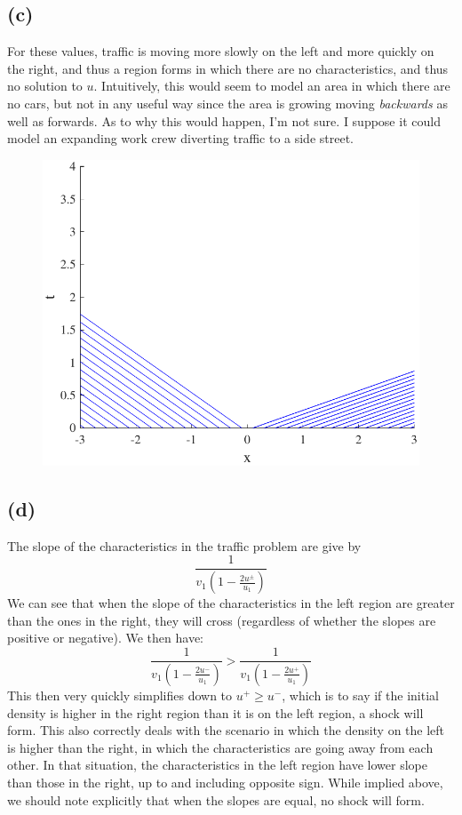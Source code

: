 \documentclass{article}
\begin{document}
\subsection*{(c)}
For these values, traffic is moving more slowly on the left and more quickly on the right, and thus a region forms in which there are no characteristics, and thus no solution to $u$. Intuitively, this would seem to model an area in which there are no cars, but not in any useful way since the area is growing moving \textit{backwards} as well as forwards. As to why this would happen, I'm not sure. I suppose it could model an expanding work crew diverting traffic to a side street.
\begin{figure}[!htbp]
  \centering
    \includegraphics[width=.49\textwidth]{hw_14_plot16.pdf}
    \caption{}
\end{figure}
\FloatBarrier
\subsection*{(d)}

The slope of the characteristics in the traffic problem are give by 
\begin{equation}
\frac{1}{v_1(1-\frac{2u^{\pm}}{u_1})}
\end{equation}
We can see that when the slope of the characteristics in the left region are greater than the ones in the right, they will cross (regardless of whether the slopes are positive or negative). We then have:
\begin{equation}
\frac{1}{v_1(1-\frac{2u^-}{u_1})} > \frac{1}{v_1(1-\frac{2u^+}{u_1})}
\end{equation}
This then very quickly simplifies down to $u^+ \geq u^-$, which is to say if the initial density is higher in the right region than it is on the left region, a shock will form. This also correctly deals with the scenario in which the density on the left is higher than the right, in which the characteristics are going away from each other. In that situation, the characteristics in the left region have lower slope than those in the right, up to and including opposite sign. While implied above, we should note explicitly that when the slopes are equal, no shock will form. 
\end{document}
